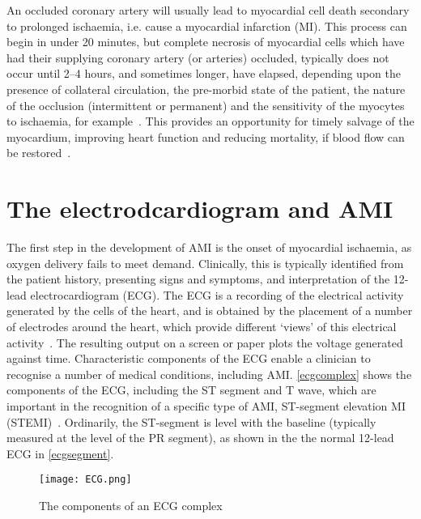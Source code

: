 An occluded coronary artery will usually lead to myocardial cell death secondary to prolonged ischaemia, i.e. cause a myocardial infarction (MI). This process can begin in under 20 minutes, but complete necrosis of myocardial cells which have had their supplying coronary artery (or arteries) occluded, typically does not occur until 2--4 hours, and sometimes longer, have elapsed, depending upon the presence of collateral circulation, the pre-morbid state of the patient, the nature of the occlusion (intermittent or permanent) and the sensitivity of the myocytes to ischaemia, for example~\citep{thygesen_third_2012}. This provides an opportunity for timely salvage of the myocardium, improving heart function and reducing mortality, if blood flow can be restored~\citep{department_of_health_treatment_2008}. 

\section{The electrodcardiogram and AMI}
\label{theelectrodcardiogramandami}

The first step in the development of AMI is the onset of myocardial ischaemia, as oxygen delivery fails to meet demand. Clinically, this is typically identified from the patient history, presenting signs and symptoms, and interpretation of the 12-lead electrocardiogram (ECG). The ECG is a recording of the electrical activity generated by the cells of the heart, and is obtained by the placement of a number of electrodes around the heart, which provide different ‘views’ of this electrical activity~\citep{kligfield_recommendations_2007}. The resulting output on a screen or paper plots the voltage generated against time. Characteristic components of the ECG enable a clinician to recognise a number of medical conditions, including AMI. \autoref{ecgcomplex} shows the components of the ECG, including the ST segment and T wave, which are important in the recognition of a specific type of AMI, ST-segment elevation MI (STEMI)~\citep{thomas_garcia_12-lead_2000}. Ordinarily, the ST-segment is level with the baseline (typically measured at the level of the PR segment), as shown in the the normal 12-lead ECG in \autoref{ecgsegment}.

\begin{figure}[htbp]
\centering
\texttt{[image: ECG.png]}
\caption{The components of an ECG complex}
\label{ecgcomplex}
\end{figure}



